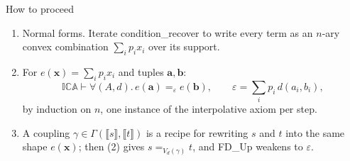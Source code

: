 \documentclass[10pt,aspectratio=169]{beamer}
\newcommand{\qeq}[1]{=_{#1}}
\newcommand{\den}[1]{\llbracket #1 \rrbracket}
\newcommand{\ICA}{\mathbb{I}\mathbb{C}\mathbb{A}}
\newcommand{\eps}{\varepsilon}
\newcommand{\Cpl}{\Gamma}
\newcommand{\rid}[1]{{\ttfamily\small #1}}
\begin{document}
                \begin{frame}{How to proceed}
                    \begin{enumerate}
                        \item Normal forms. Iterate
                            \rid{condition\_recover} to
                            write every term as an $n$-ary convex
                            combination
                            $\sum_i p_i x_i$ over its support.
                            \medskip
                        \item For $e(\bm x) =
                            \sum_i p_i x_i$ and
                            tuples $\bm a, \bm b$:
                            \[
                                \ICA \vdash \forall(A,d).\, e(\bm
                                a) \qeq{\eps} e(\bm b),
                                \qquad \eps = \textstyle\sum_i
                                p_i\, d(a_i,b_i),
                            \]
                            by induction on $n$, one instance of
                            the interpolative axiom per
                            step.
                            \medskip
                        \item A
                            coupling $\gamma \in
                            \Cpl(\den{s},\den{t})$ is a recipe
                            for rewriting $s$ and $t$ into
                            the same shape $e(\bm x)$; then (2) gives
                            $s \qeq{V_d(\gamma)} t$, and
                            \rid{FD\_Up} weakens to $\eps$.
                            \medskip
                    \end{enumerate}
                \end{frame}

\end{document}
